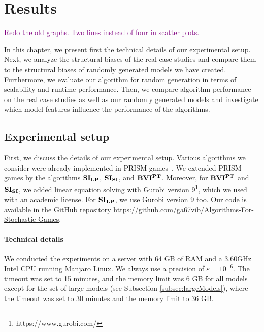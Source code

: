 \chapter{Results} \label{ch:results}

\textcolor{purple}{Redo the old graphs. Two lines instead of four in scatter plots.}

In this chapter, we present first the technical details of our experimental setup.
Next, we analyze the structural biases of the real case studies and compare them to the structural biases of randomly generated models we have created.
Furthermore, we evaluate our algorithm for random generation in terms of scalability and runtime performance.
Then, we compare algorithm performance on the real case studies as well as our randomly generated models and investigate which model features influence the performance of the algorithms.



\section{Experimental setup}
First, we discuss the details of our experimental setup.
Various algorithms we consider were already implemented in PRISM-games~\cite{prismgames3}.
We extended PRISM-games by the algorithms $\mathbf{SI_{LP}}$, $\mathbf{SI_{SI}}$, and $\mathbf{BVI^{PT}}$.
Moreover, for $\mathbf{BVI^{PT}}$ and $\mathbf{SI_{SI}}$, we added linear equation solving with Gurobi version 9\footnote{https://www.gurobi.com/}, which we used with an academic license.
For $\mathbf{SI_{LP}}$, we use Gurobi version 9 too.
Our code is available in the GitHub repository \url{https://github.com/ga67vib/Algorithms-For-Stochastic-Games}.

\subsubsection*{Technical details}
We conducted the experiments on a server with 64 GB of RAM and a 3.60GHz Intel CPU running Manjaro Linux. %
We always use a precision of $\varepsilon=10^{-6}$. 
The timeout was set to 15 minutes, and the memory limit was 6 GB for all models except for the set of large models (see Subsection \ref{subsec:largeModels}),
where the timeout was set to 30 minutes and the memory limit to 36 GB.


